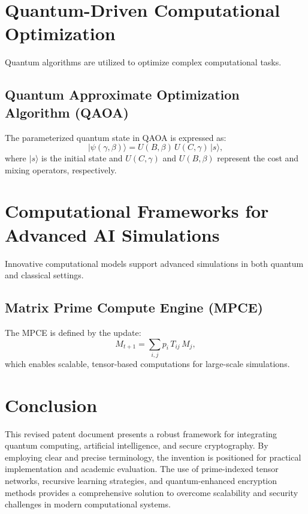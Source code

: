 \documentclass{article}
\theoremstyle{plain}
\begin{document}
\section{Quantum-Driven Computational Optimization}
Quantum algorithms are utilized to optimize complex computational tasks.

\subsection{Quantum Approximate Optimization Algorithm (QAOA)}
The parameterized quantum state in QAOA is expressed as:
\[
|\psi(\gamma,\beta)\rangle = U(B,\beta)\, U(C,\gamma)\, |s\rangle,
\]
where $|s\rangle$ is the initial state and $U(C,\gamma)$ and $U(B,\beta)$ represent the cost and mixing operators, respectively.

\section{Computational Frameworks for Advanced AI Simulations}
Innovative computational models support advanced simulations in both quantum and classical settings.

\subsection{Matrix Prime Compute Engine (MPCE)}
The MPCE is defined by the update:
\[
M_{t+1} = \sum_{i,j} p_i\, T_{ij}\, M_j,
\]
which enables scalable, tensor-based computations for large-scale simulations.

\section{Conclusion}
This revised patent document presents a robust framework for integrating quantum computing, artificial intelligence, and secure cryptography. By employing clear and precise terminology, the invention is positioned for practical implementation and academic evaluation. The use of prime-indexed tensor networks, recursive learning strategies, and quantum-enhanced encryption methods provides a comprehensive solution to overcome scalability and security challenges in modern computational systems.


\nocite{*}


\end{document}
